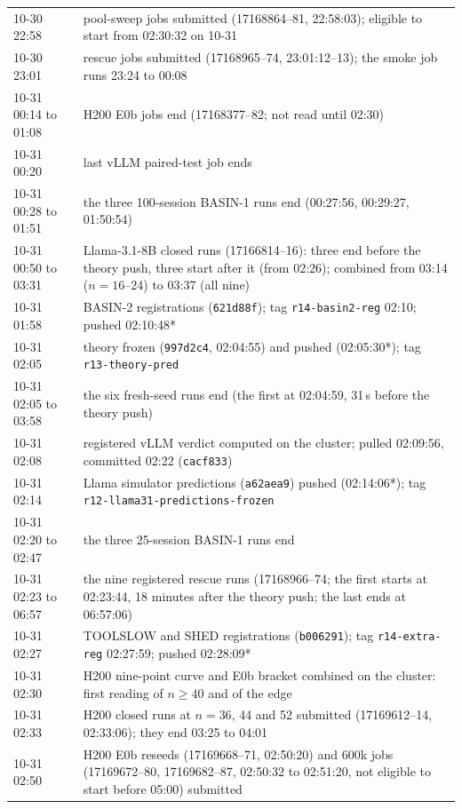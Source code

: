 \begin{table}[tbp]
\begin{tabular}{@{}p{2.3cm} >{\raggedright\arraybackslash}p{14.4cm}@{}}
10-30 22:58 & pool-sweep jobs submitted (17168864--81, 22:58:03); eligible to start from 02:30:32 on 10-31\\
10-30 23:01 & rescue jobs submitted (17168965--74, 23:01:12--13); the smoke job runs 23:24 to 00:08\\
10-31 00:14 to 01:08 & H200 E0b jobs end (17168377--82; not read until 02:30)\\
10-31 00:20 & last vLLM paired-test job ends\\
10-31 00:28 to 01:51 & the three 100-session BASIN-1 runs end (00:27:56, 00:29:27, 01:50:54)\\
10-31 00:50 to 03:31 & Llama-3.1-8B closed runs (17166814--16): three end before the theory push, three start after it (from 02:26); combined from 03:14 ($n=16$--24) to 03:37 (all nine)\\
10-31 01:58 & BASIN-2 registrations (\texttt{621d88f}); tag \texttt{r14-basin2-reg} 02:10; pushed 02:10:48*\\
10-31 02:05 & theory frozen (\texttt{997d2c4}, 02:04:55) and pushed (02:05:30*); tag \texttt{r13-theory-pred}\\
10-31 02:05 to 03:58 & the six fresh-seed runs end (the first at 02:04:59, 31\,s before the theory push)\\
10-31 02:08 & registered vLLM verdict computed on the cluster; pulled 02:09:56, committed 02:22 (\texttt{cacf833})\\
10-31 02:14 & Llama simulator predictions (\texttt{a62aea9}) pushed (02:14:06*); tag \texttt{r12-llama31-predictions-frozen}\\
10-31 02:20 to 02:47 & the three 25-session BASIN-1 runs end\\
10-31 02:23 to 06:57 & the nine registered rescue runs (17168966--74; the first starts at 02:23:44, 18 minutes after the theory push; the last ends at 06:57:06)\\
10-31 02:27 & TOOLSLOW and SHED registrations (\texttt{b006291}); tag \texttt{r14-extra-reg} 02:27:59; pushed 02:28:09*\\
10-31 02:30 & H200 nine-point curve and E0b bracket combined on the cluster: first reading of $n\ge40$ and of the edge\\
10-31 02:33 & H200 closed runs at $n=36$, 44 and 52 submitted (17169612--14, 02:33:06); they end 03:25 to 04:01\\
10-31 02:50 & H200 E0b reseeds (17169668--71, 02:50:20) and 600k jobs (17169672--80, 17169682--87, 02:50:32 to 02:51:20, not eligible to start before 05:00) submitted\\

\end{tabular}
\end{table}
